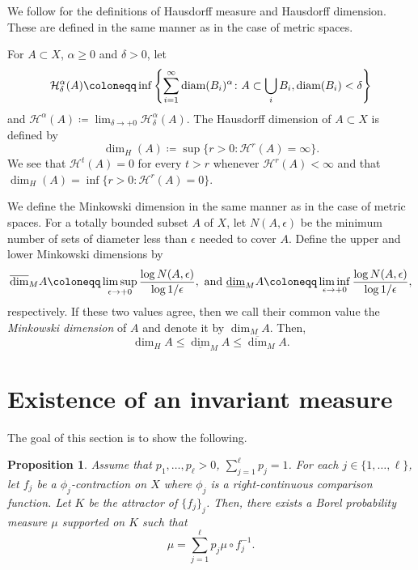 \documentclass[a4paper, reqno, 11pt]{amsart}
\newtheorem{Prop}[Thm]{Proposition}
\theoremstyle{definition}
\begin{document}
We follow \cite{BessenyeiPenzes2022} for the definitions of Hausdorff measure and Hausdorff dimension. 
These are defined in the same manner as in the case of metric spaces. 

For $A \subset X$, $\alpha \ge 0$ and $\delta > 0$, let 
\[ \mathcal{H}^{\alpha}_{\delta}(A) \coloneqq \inf\left\{ \sum_{i=1}^{\infty} \textup{diam}(B_i)^{\alpha} \colon A \subset \bigcup_{i} B_{i}, \textup{diam}(B_i) < \delta   \right\} \]
and $\mathcal{H}^{\alpha}(A) \coloneqq \lim_{\delta \to +0} \mathcal{H}^{\alpha}_{\delta}(A)$. 
The Hausdorff dimension of $A \subset X$ is defined by 
\[ \dim_H (A) \coloneqq \sup\{r > 0 \colon \mathcal{H}^r (A) = \infty \}. \]
We see that $\mathcal{H}^t (A) = 0$ for every $t > r$ whenever $\mathcal{H}^r (A) < \infty$ and that $\dim_H (A) = \inf\{r > 0 \colon \mathcal{H}^{r}(A) = 0\}$. 

We define the Minkowski dimension in the same manner as in the case of metric spaces. 
For a totally bounded subset $A$ of $X$, 
let $N(A, \epsilon)$ be the minimum number of sets of diameter less than $\epsilon$ needed to cover $A$. 
Define the upper and lower Minkowski dimensions by 
\[ \overline{\dim}_M A \coloneqq \limsup_{\epsilon \to +0} \frac{\log N(A, \epsilon)}{\log 1/\epsilon},  \textup{ and } \underline{\dim}_M A \coloneqq \liminf_{\epsilon \to +0} \frac{\log N(A, \epsilon)}{\log 1/\epsilon},  \]
respectively. 
If these two values agree, then we call their common value the {\it Minkowski dimension} of $A$ and denote it by $\dim_M A$. 
Then, 
\[ \dim_H A \le \underline{\dim}_M A \le \overline{\dim}_M  A.  \]



\section{Existence of an invariant measure}\label{sec:inv-measure}

The goal of this section is to show the following. 

\begin{Prop}\label{prop:exist-inv-measure}
Assume that $p_1, \dots, p_{\ell} > 0$, $\sum_{j = 1}^{\ell} p_j = 1$. 
For each $j \in \{1, \dots, \ell\}$, 
let $f_j$ be a $\phi_j$-contraction on $X$ where $\phi_j$ is a right-continuous comparison function. 
Let $K$ be the attractor of $\{f_j\}_j$. 
Then, there exists a Borel probability measure $\mu$ supported on $K$ such that 
\begin{equation}\label{eq:invariance-measure} 
\mu = \sum_{j = 1}^{\ell} p_j \mu \circ f_j^{-1}. 
\end{equation}
\end{Prop}
\end{document}
